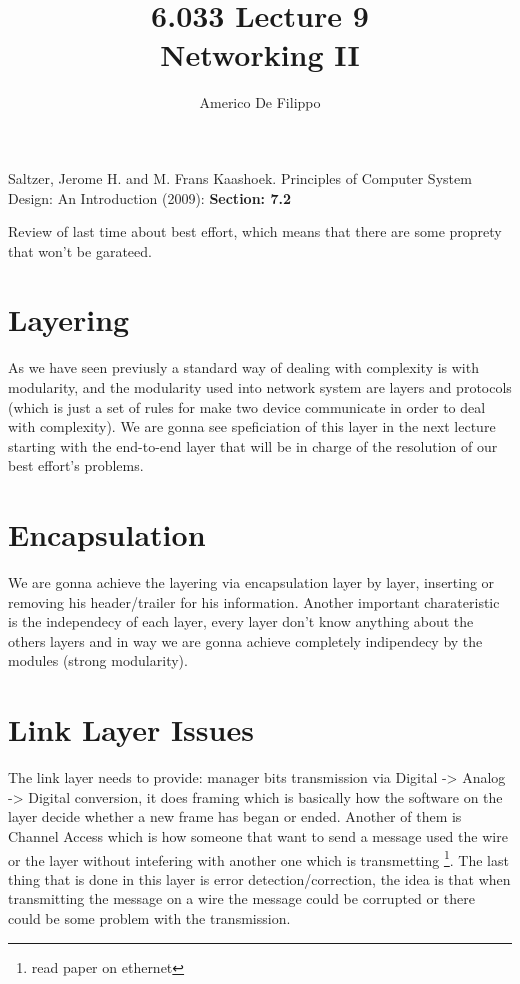 \documentclass{article}
\title{6.033 Lecture 9 \\ Networking II}
\author{Americo De Filippo}
\begin{document}
 
  \maketitle
  \begin{thebibliography}{9}
    Saltzer, Jerome H. and M. Frans Kaashoek. Principles of Computer System Design: An Introduction (2009): \textbf{Section: 7.2}
  \end{thebibliography}
  Review of last time about best effort, which means that there are some proprety that 
  won't be garateed.
  \section{Layering}
    As we have seen previusly a standard way of dealing with complexity is with modularity, 
    and the modularity used into network system are layers and protocols (which is just 
    a set of rules for make two device communicate in order to deal with complexity).
    We are gonna see speficiation of this layer in the next lecture starting with the end-to-end
    layer that will be in charge of the resolution of our best effort's problems.
  \section{Encapsulation}
    We are gonna achieve the layering via encapsulation layer by layer, inserting or 
    removing his header/trailer for his information. Another important charateristic is the
    independecy of each layer, every layer don't know anything about the others layers and in 
    way we are gonna achieve completely indipendecy by the modules (strong modularity).
  \section{Link Layer Issues}
    The link layer needs to provide: manager bits transmission via Digital -> Analog -> Digital
    conversion, it does framing which is basically how the software on the layer decide 
    whether a new frame has began or ended. Another of them is Channel Access which is how
    someone that want to send a message used the wire or the layer without intefering with 
    another one which is transmetting \footnote{read paper on ethernet}. The last
    thing that is done in this layer is error detection/correction, the idea is that 
    when transmitting the message on a wire the message could be corrupted or there could be 
    some problem with the transmission. 
\end{document}
